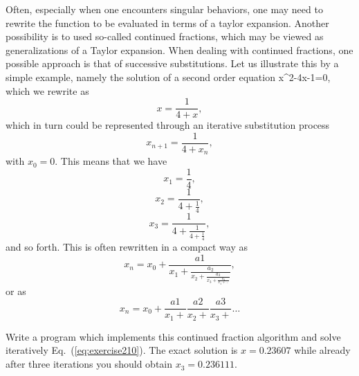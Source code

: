 \begin{prob}

 Often, especially when one encounters singular behaviors, one may
 need to rewrite the function to be evaluated in terms of a taylor
 expansion. Another possibility is to used so-called continued fractions,
 which may be viewed as generalizations of a Taylor expansion.
 When dealing with continued fractions, one possible approach is that
 of successive substitutions. Let us illustrate this by a simple example,
 namely the solution of a second order equation
%
 \be \label{eq:exercise210}
    x^2-4x-1=0,
 \ee
%
 which we rewrite as
%
 \[
     x=\frac{1}{4+x},
 \]
%
 which in turn could be represented through an iterative substitution
 process 
%
 \[
     x_{n+1}=\frac{1}{4+x_{n}},
 \]
%
 with $x_0=0$. This means that we have
%
 \[
     x_{1}=\frac{1}{4},
 \]
%
 \[
     x_{2}=\frac{1}{4+\frac{1}{4}},
 \]
%
 \[
     x_{3}=\frac{1}{4+\frac{1}{4+\frac{1}{4}}},
 \]
%
 and so forth.
 This is often rewritten in a compact way as 
 \[
     x_{n}=x_0+\frac{a1}{x_1+\frac{a_2}{x_2+\frac{a_3}
                {x_3+\frac{a_4}{x_4+\dots}} }},
 \]
%
 or as 
%
 \[
     x_{n}=x_0+\frac{a1}{x_1+}\frac{a2}{x_2+}\frac{a3}{x_3+}\dots
 \]

Write a program which implements this continued fraction algorithm and solve 
iteratively Eq.~(\ref{eq:exercise210}).   The exact solution is  $x=0.23607$ 
 while already after three iterations you should obtain $x_3=0.236111$.
\end{prob}


